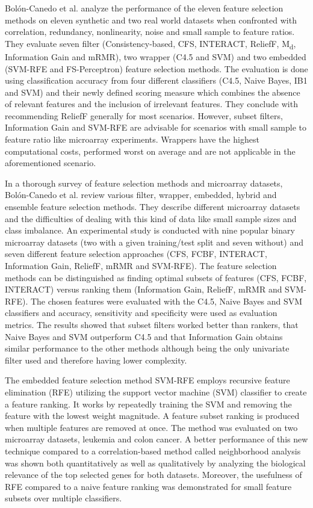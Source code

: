Bolón-Canedo et al. analyze the performance of the eleven feature selection methods on eleven synthetic and two real world datasets when confronted with correlation, redundancy, nonlinearity, noise and small sample to feature ratios. They evaluate seven filter (Consistency-based, CFS, INTERACT, ReliefF, M\textsubscript{d}, Information Gain and mRMR), two wrapper (C4.5 and SVM) and two embedded (SVM-RFE and FS-Perceptron) feature selection methods. The evaluation is done using classification accuracy from four different classifiers (C4.5, Naive Bayes, IB1 and SVM) and their newly defined scoring measure which combines the absence of relevant features and the inclusion of irrelevant features. They conclude with recommending ReliefF generally for most scenarios. However, subset filters, Information Gain and SVM-RFE are advisable for scenarios with small sample to feature ratio like microarray experiments. Wrappers have the highest computational costs, performed worst on average and are not applicable in the aforementioned scenario. \cite{bolon2013review}

In a thorough survey of feature selection methods and microarray datasets, Bolón-Canedo et al. review various filter, wrapper, embedded, hybrid and ensemble feature selection methods. They describe different microarray datasets and the difficulties of dealing with this kind of data like small sample sizes and class imbalance. An experimental study is conducted with nine popular binary microarray datasets (two with a given training/test split and seven without) and seven different feature selection approaches (CFS, FCBF, INTERACT, Information Gain, ReliefF, mRMR and SVM-RFE). The feature selection methods can be distinguished as finding optimal subsets of features (CFS, FCBF, INTERACT) versus ranking them (Information Gain, ReliefF, mRMR and SVM-RFE). The chosen features were evaluated with the C4.5, Naive Bayes and SVM classifiers and accuracy, sensitivity and specificity were used as evaluation metrics. The results showed that subset filters worked better than rankers, that Naive Bayes and SVM outperform C4.5 and that Information Gain obtains similar performance to the other methods although being the only univariate filter used and therefore having lower complexity. \cite{Bolon-Canedo2014}

The embedded feature selection method SVM-RFE employs recursive feature elimination (RFE) utilizing the support vector machine (SVM) classifier to create a feature ranking. It works by repeatedly training the SVM and removing the feature with the lowest weight magnitude. A feature subset ranking is produced when multiple features are removed at once. The method was evaluated on two microarray datasets, leukemia and colon cancer. A better performance of this new technique compared to a correlation-based method called neighborhood analysis was shown both quantitatively as well as qualitatively by analyzing the biological relevance of the top selected genes for both datasets. Moreover, the usefulness of RFE compared to a naive feature ranking was demonstrated for small feature subsets over multiple classifiers. \cite{Guyon2002}

